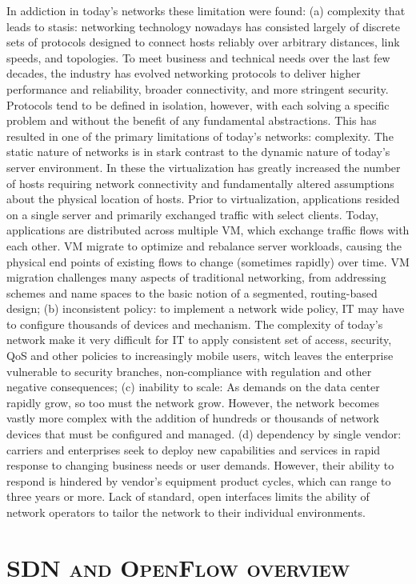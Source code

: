 In addiction in today's networks these limitation were found: (a) complexity that leads to stasis: networking technology nowadays has consisted largely of discrete sets of protocols designed to connect hosts reliably over arbitrary distances, link speeds, and topologies. To meet business and technical needs over the last few decades, the industry has evolved networking protocols to deliver higher performance and reliability, broader connectivity, and more stringent security. Protocols tend to be defined in isolation, however, with each solving a specific problem and without the benefit of any fundamental abstractions. This has resulted in one of the primary limitations of today's networks: complexity. The static nature of networks is in stark contrast to the dynamic nature of today's server environment. In these the virtualization has greatly increased the number of hosts requiring network connectivity and fundamentally altered assumptions about the physical location of hosts. Prior to virtualization, applications resided on a single server and primarily exchanged traffic with select clients. Today, applications are distributed across multiple \ac{VM}, which exchange traffic flows with each other. \ac{VM} migrate to optimize and rebalance server workloads, causing the physical end points of existing flows to change (sometimes rapidly) over time. \ac{VM} migration challenges many aspects of traditional networking, from addressing schemes and name spaces to the basic notion of a segmented, routing-based design; (b) inconsistent policy: to implement a network wide policy, \ac{IT} may have to configure thousands of devices and mechanism. The complexity of today's network make it very difficult for \ac{IT} to apply consistent set of access, security, \ac{QoS} and other policies to increasingly mobile users, witch leaves the enterprise vulnerable to security branches, non-compliance with regulation and other negative consequences; (c) inability to scale: As demands on the data center rapidly grow, so too must the network grow. However, the network becomes vastly more complex with the addition of hundreds or thousands of network devices that must be configured and managed. (d) dependency by single vendor: carriers and enterprises seek to deploy new capabilities and services in rapid response to changing business needs or user demands. However, their ability to respond is hindered by vendor's equipment product cycles, which can range to three years or more. Lack of standard, open interfaces limits the ability of network operators to tailor the network to their individual environments.

\section*{\small \textsc{\ac{SDN} and OpenFlow overview}}